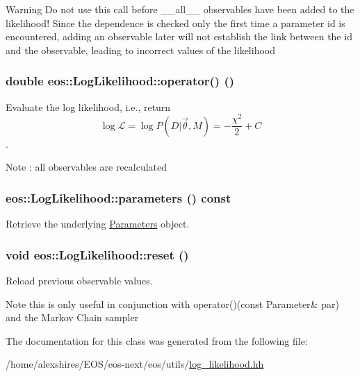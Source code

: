 \begin{DoxyWarning}{Warning}
Do not use this call before \_\-\_\-all\_\-\_\- observables have been added to the likelihood! Since the dependence is checked only the first time a parameter id is encountered, adding an observable later will not establish the link between the id and the observable, leading to incorrect values of the likelihood 
\end{DoxyWarning}
\hypertarget{classeos_1_1LogLikelihood_a3852b27cbc7bc0254c9323dfedf31576}{
\subsubsection[{operator()}]{\setlength{\rightskip}{0pt plus 5cm}double eos::LogLikelihood::operator() ()}}
\label{classeos_1_1LogLikelihood_a3852b27cbc7bc0254c9323dfedf31576}
Evaluate the log likelihood, i.e., return \[ \log \mathcal{L} = \log P(D | \vec{\theta}, M)= - \frac{\chi^2}{2} + C\]. \begin{DoxyNote}{Note}
: all observables are recalculated 
\end{DoxyNote}
\hypertarget{classeos_1_1LogLikelihood_abf5c017096b99502c3bafb47a6297852}{
\subsubsection[{parameters}]{ eos::LogLikelihood::parameters () const}}
\label{classeos_1_1LogLikelihood_abf5c017096b99502c3bafb47a6297852}
Retrieve the underlying \hyperlink{classeos_1_1Parameters}{Parameters} object. \hypertarget{classeos_1_1LogLikelihood_a43d24e99c8f7e4209e6bb763186123d8}{
\subsubsection[{reset}]{\setlength{\rightskip}{0pt plus 5cm}void eos::LogLikelihood::reset ()}}
\label{classeos_1_1LogLikelihood_a43d24e99c8f7e4209e6bb763186123d8}
Reload previous observable values.

\begin{DoxyNote}{Note}
this is only useful in conjunction with operator()(const Parameter\& par) and the Markov Chain sampler 
\end{DoxyNote}


The documentation for this class was generated from the following file:\begin{DoxyCompactItemize}
\item 
/home/alexshires/EOS/eos-\/next/eos/utils/\hyperlink{log__likelihood_8hh}{log\_\-likelihood.hh}\end{DoxyCompactItemize}
